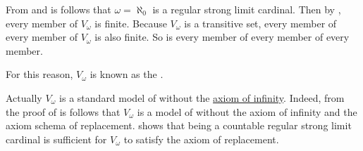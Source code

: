 \begin{remark}\label{rem:universe_of_hereditary_finite_sets}
  From  and  is follows that \( \omega = \aleph_0 \) is a regular strong limit cardinal. Then by , every member of \( V_\omega \) is finite. Because \( V_\omega \) is a transitive set, every member of every member of \( V_\omega \) is also finite. So is every member of every member of every member.

  For this reason, \( V_\omega \) is known as the .

  Actually \( V_\omega \) is a standard model of  without the \hyperref[def:zfc/infinity]{axiom of infinity}. Indeed, from the proof of  is follows that \( V_\omega \) is a model of  without the axiom of infinity and the axiom schema of replacement.  shows that being a countable regular strong limit cardinal is sufficient for \( V_\omega \) to satisfy the axiom of replacement.
\end{remark}
